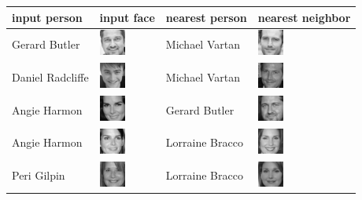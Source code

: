 \documentclass[]{article}
\begin{document}
\begin{longtable}[c]{@{}llll@{}}
\toprule
input person & input face & nearest person & nearest
neighbor\tabularnewline
\midrule
\endhead
Gerard Butler & \includegraphics{assets/person_mismatch/real01.jpg} &
Michael Vartan &
\includegraphics{assets/person_mismatch/recognized01.jpg}\tabularnewline
Daniel Radcliffe & \includegraphics{assets/person_mismatch/real02.jpg} &
Michael Vartan &
\includegraphics{assets/person_mismatch/recognized02.jpg}\tabularnewline
Angie Harmon & \includegraphics{assets/person_mismatch/real03.jpg} &
Gerard Butler &
\includegraphics{assets/person_mismatch/recognized03.jpg}\tabularnewline
Angie Harmon & \includegraphics{assets/person_mismatch/real04.jpg} &
Lorraine Bracco &
\includegraphics{assets/person_mismatch/recognized04.jpg}\tabularnewline
Peri Gilpin & \includegraphics{assets/person_mismatch/real05.jpg} &
Lorraine Bracco &
\includegraphics{assets/person_mismatch/recognized05.jpg}\tabularnewline
\bottomrule
\end{longtable}
\end{document}
